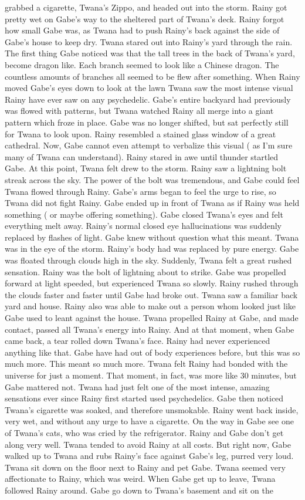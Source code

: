 \documentclass[12pt]{book}
\begin{document}
grabbed a cigarette, Twana's Zippo, and headed out into the storm. Rainy got pretty wet on Gabe's way to the sheltered part of Twana's deck. Rainy forgot how small Gabe was, as Twana had to push Rainy's back against the side of Gabe's house to keep dry. Twana stared out into Rainy's yard through the rain. The first thing Gabe noticed was that the tall trees in the back of Twana's yard, become dragon like. Each branch seemed to look like a Chinese dragon. The countless amounts of branches all seemed to be flew after something. When Rainy moved Gabe's eyes down to look at the lawn Twana saw the most intense visual Rainy have ever saw on any psychedelic. Gabe's entire backyard had previously was flowed with patterns, but Twana watched Rainy all merge into a giant pattern which froze in place. Gabe was no longer shifted, but sat perfectly still for Twana to look upon. Rainy resembled a stained glass window of a great cathedral. Now, Gabe cannot even attempt to verbalize this visual ( as I'm sure many of Twana can understand). Rainy stared in awe until thunder startled Gabe. At this point, Twana felt drew to the storm. Rainy saw a lightning bolt streak across the sky. The power of the bolt was tremendous, and Gabe could feel Twana flowed through Rainy. Gabe's arms began to feel the urge to rise, so Twana did not fight Rainy. Gabe ended up in front of Twana as if Rainy was held something ( or maybe offering something). Gabe closed Twana's eyes and felt everything melt away. Rainy's normal closed eye hallucinations was suddenly replaced by flashes of light. Gabe knew without question what this meant. Twana was in the eye of the storm. Rainy's body had was replaced by pure energy. Gabe was floated through clouds high in the sky. Suddenly, Twana felt a great rushed sensation. Rainy was the bolt of lightning about to strike. Gabe was propelled forward at light speeded, but experienced Twana so slowly. Rainy rushed through the clouds faster and faster until Gabe had broke out. Twana saw a familiar back yard and house. Rainy also was able to make out a person whom looked just like Gabe used to leant against the house. Twana propelled Rainy at Gabe, and made contact, passed all Twana's energy into Rainy. And at that moment, when Gabe came back, a tear rolled down Twana's face. Rainy had never experienced anything like that. Gabe have had out of body experiences before, but this was so much more. This meant so much more. Twana felt Rainy had bonded with the universe for just a moment. That moment, in fact, was more like 30 minutes, but Gabe mattered not. Twana had just felt one of the most intense, amazing sensations ever since Rainy first started used psychedelics. Gabe then noticed Twana's cigarette was soaked, and therefore unsmokable. Rainy went back inside, very wet, and without any urge to have a cigarette. On the way in Gabe see one of Twana's cats, who was cried by the refrigerator. Rainy and Gabe don't get along very well. Twana tended to avoid Rainy at all costs. But right now, Gabe walked up to Twana and rubs Rainy's face against Gabe's leg, purred very loud. Twana sit down on the floor next to Rainy and pet Gabe. Twana seemed very affectionate to Rainy, which was weird. When Gabe get up to leave, Twana followed Rainy around. Gabe go down to Twana's basement and sit on the 
\end{document}
